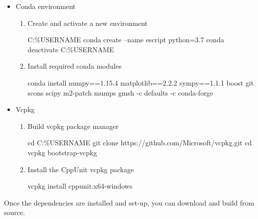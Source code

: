 \documentclass{esysdoc}
\begin{document}
\begin{itemize}
\item Conda environment
\begin{enumerate}
\item Create and activate a new environment
\begin{shellCode}
C:\Users\%USERNAME%
conda create --name escript python=3.7
conda deactivate
C:\Users\%USERNAME%
\end{shellCode}
\item Install required conda modules
\begin{shellCode}
conda install numpy==1.15.4 matplotlib==2.2.2 sympy==1.1.1
    boost git scons scipy m2-patch mumps gmsh
    -c defaults -c conda-forge
\end{shellCode}
\end{enumerate}
\item Vcpkg
\begin{enumerate}
\item Build vcpkg package manager
\begin{shellCode}
cd C:\Users\%USERNAME%
git clone https://github.com/Microsoft/vcpkg.git
cd vcpkg
bootstrap-vcpkg
\end{shellCode}
\item Install the CppUnit vcpkg package
\begin{shellCode}
vcpkg install cppunit:x64-windows
\end{shellCode}
\end{enumerate}
\end{itemize}

\noindent Once the dependencies are installed and set-up, you can download and
build \escript from source.
\end{document}
